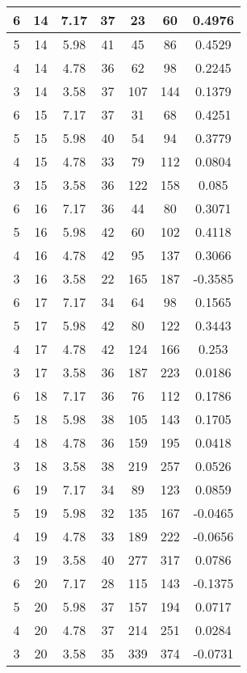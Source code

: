 \documentclass[letterpaper, 12pt]{article}
\begin{document}
\begin{longtable}{|c|c|c|c|c|c|c|}
\hline
6 & 14 & 7.17 & 37 & 23 & 60 & 0.4976 \\
\hline
5 & 14 & 5.98 & 41 & 45 & 86 & 0.4529 \\
\hline
4 & 14 & 4.78 & 36 & 62 & 98 & 0.2245 \\
\hline
3 & 14 & 3.58 & 37 & 107 & 144 & 0.1379 \\
\hline
6 & 15 & 7.17 & 37 & 31 & 68 & 0.4251 \\
\hline
5 & 15 & 5.98 & 40 & 54 & 94 & 0.3779 \\
\hline
4 & 15 & 4.78 & 33 & 79 & 112 & 0.0804 \\
\hline
3 & 15 & 3.58 & 36 & 122 & 158 & 0.085 \\
\hline
6 & 16 & 7.17 & 36 & 44 & 80 & 0.3071 \\
\hline
5 & 16 & 5.98 & 42 & 60 & 102 & 0.4118 \\
\hline
4 & 16 & 4.78 & 42 & 95 & 137 & 0.3066 \\
\hline
3 & 16 & 3.58 & 22 & 165 & 187 & -0.3585 \\
\hline
6 & 17 & 7.17 & 34 & 64 & 98 & 0.1565 \\
\hline
5 & 17 & 5.98 & 42 & 80 & 122 & 0.3443 \\
\hline
4 & 17 & 4.78 & 42 & 124 & 166 & 0.253 \\
\hline
3 & 17 & 3.58 & 36 & 187 & 223 & 0.0186 \\
\hline
6 & 18 & 7.17 & 36 & 76 & 112 & 0.1786 \\
\hline
5 & 18 & 5.98 & 38 & 105 & 143 & 0.1705 \\
\hline
4 & 18 & 4.78 & 36 & 159 & 195 & 0.0418 \\
\hline
3 & 18 & 3.58 & 38 & 219 & 257 & 0.0526 \\
\hline
6 & 19 & 7.17 & 34 & 89 & 123 & 0.0859 \\
\hline
5 & 19 & 5.98 & 32 & 135 & 167 & -0.0465 \\
\hline
4 & 19 & 4.78 & 33 & 189 & 222 & -0.0656 \\
\hline
3 & 19 & 3.58 & 40 & 277 & 317 & 0.0786 \\
\hline
6 & 20 & 7.17 & 28 & 115 & 143 & -0.1375 \\
\hline
5 & 20 & 5.98 & 37 & 157 & 194 & 0.0717 \\
\hline
4 & 20 & 4.78 & 37 & 214 & 251 & 0.0284 \\
\hline
3 & 20 & 3.58 & 35 & 339 & 374 & -0.0731 \\
\hline
\end{longtable}
\end{document}
